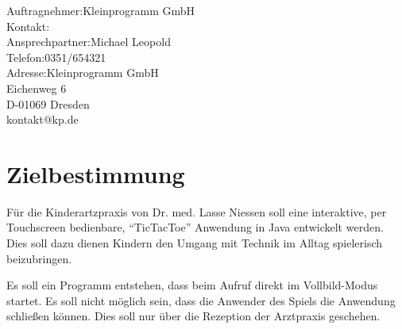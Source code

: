 \documentclass[12pt]{article}
\begin{document}
\begin{titlepage}
	\begin{flushleft}
	Auftragnehmer:\hspace*{14mm}Kleinprogramm GmbH \\
	Kontakt:\\
		\hspace*{5mm}Ansprechpartner:\hspace*{6mm}Michael Leopold\\
		\hspace*{5mm}Telefon:\hspace*{23mm}0351/654321\\
		\hspace*{5mm}Adresse:\hspace*{22mm}Kleinprogramm GmbH\\
		\hspace*{42mm}Eichenweg 6\\
		\hspace*{42mm}D-01069 Dresden\\	
		\hspace*{42mm}kontakt@kp.de
	\end{flushleft}
	\newpage \thispagestyle{empty} \tableofcontents 
\end{titlepage}


\setcounter{page}{3}

\section{Zielbestimmung}
Für die Kinderartzpraxis von Dr. med. Lasse Niessen soll eine interaktive, per Touchscreen bedienbare, "`\Gls{TicTacToe}"' Anwendung in Java entwickelt werden. Dies soll dazu dienen Kindern den Umgang mit Technik im Alltag spielerisch beizubringen.

Es soll ein Programm entstehen, dass beim Aufruf direkt im Vollbild-Modus startet. Es soll nicht möglich sein, dass die Anwender des Spiels die Anwendung schließen können. Dies soll nur über die Rezeption der Arztpraxis geschehen.
\end{document}
